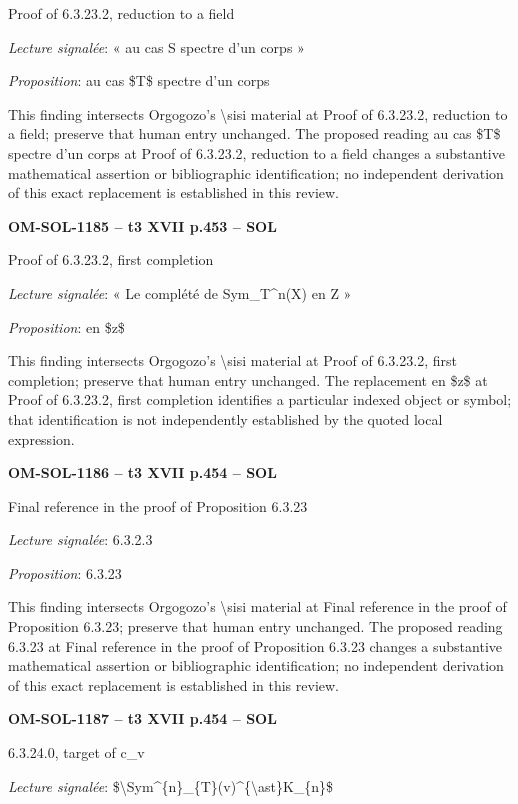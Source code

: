 Proof of 6.3.23.2, reduction to a field\par
\emph{Lecture signalée}: « au cas S spectre d'un corps »\par
\emph{Proposition}: au cas \$T\$ spectre d'un corps\par
This finding intersects Orgogozo's \textbackslash{}sisi material at Proof of 6.3.23.2, reduction to a field; preserve that human entry unchanged. The proposed reading au cas \$T\$ spectre d'un corps at Proof of 6.3.23.2, reduction to a field changes a substantive mathematical assertion or bibliographic identification; no independent derivation of this exact replacement is established in this review.\par
\par\noindent\textbf{OM-SOL-1185 -- t3 XVII p.453 -- SOL}\par
Proof of 6.3.23.2, first completion\par
\emph{Lecture signalée}: « Le complété de Sym\_T\textasciicircum{}n(X) en Z »\par
\emph{Proposition}: en \$z\$\par
This finding intersects Orgogozo's \textbackslash{}sisi material at Proof of 6.3.23.2, first completion; preserve that human entry unchanged. The replacement en \$z\$ at Proof of 6.3.23.2, first completion identifies a particular indexed object or symbol; that identification is not independently established by the quoted local expression.\par
\par\noindent\textbf{OM-SOL-1186 -- t3 XVII p.454 -- SOL}\par
Final reference in the proof of Proposition 6.3.23\par
\emph{Lecture signalée}: 6.3.2.3\par
\emph{Proposition}: 6.3.23\par
This finding intersects Orgogozo's \textbackslash{}sisi material at Final reference in the proof of Proposition 6.3.23; preserve that human entry unchanged. The proposed reading 6.3.23 at Final reference in the proof of Proposition 6.3.23 changes a substantive mathematical assertion or bibliographic identification; no independent derivation of this exact replacement is established in this review.\par
\par\noindent\textbf{OM-SOL-1187 -- t3 XVII p.454 -- SOL}\par
6.3.24.0, target of c\_v\par
\emph{Lecture signalée}: \$\textbackslash{}Sym\textasciicircum{}\{n\}\_\{T\}(v)\textasciicircum{}\{\textbackslash{}ast\}K\_\{n\}\$\par
